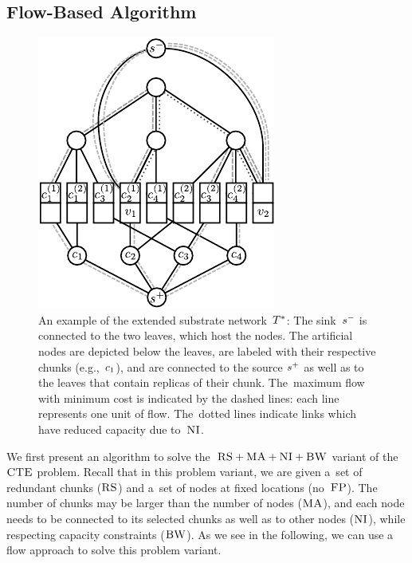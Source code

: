 \subsection{Flow-Based Algorithm}\label{ssec:flow}

\begin{figure}
\centering
\includegraphics[width=0.5\columnwidth]{figs/static-mapping/flow_ma_cv}
\caption{An example of the extended substrate
network~$T^*$: The sink~$s^{-}$ is connected to the two leaves, which host the
nodes. The artificial nodes are depicted below the leaves, are labeled with
their respective chunks (e.g.,~$c_1$), and are connected to the source
$s^{+}$ as well as to the leaves that contain replicas of their chunk.
The~maximum flow with minimum cost is indicated by the dashed lines: each line
represents one unit of flow. The~dotted lines indicate links which have reduced
capacity due to~$\textsc{NI}$.}
\label{fig:flow_construction}
\end{figure}





We first present an algorithm to solve the~$\textsc{RS}+\textsc{MA}+\textsc{NI}+\textsc{BW}$ variant of the $\textsc{CTE}$ problem.
Recall that in this problem variant,
we are given a~set of redundant chunks ($\textsc{RS}$) and a~set of
nodes
at fixed locations (no~$\textsc{FP}$). The number of chunks may be larger than the number
of nodes ($\textsc{MA}$), and each node needs to be connected
to its selected chunks as well as to other nodes ($\textsc{NI}$), while respecting
capacity constraints ($\textsc{BW}$).
As we see in the following, we can use a flow approach to solve this
problem variant.


